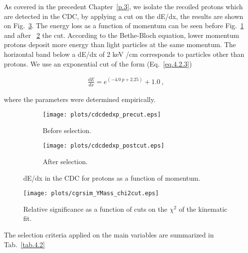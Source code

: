 As covered in the precedent Chapter~\ref{p.3}, we isolate the recoiled protons which are detected in the CDC, by applying a cut on the dE/dx, the results are shown on Fig.~\ref{fig.4.2.2}. The energy loss as a function of momentum can be seen before Fig.~\ref{fig.4.2.2.a} and after ~\ref{fig.4.2.2.b} the cut. According to the Bethe-Bloch equation, lower momentum protons deposit more energy than light particles at the same momentum. The horizontal band below a dE/dx of 2 keV /cm corresponds to particles other than protons. We use an exponential cut of the form (Eq.~\ref{eq.4.2.3})

\begin{equation}
    \begin{aligned}
        \label{eq.4.2.3}
        \frac{dE}{dx} =  e^{(-4.0~p + 2.25)} + 1.0~,
    \end{aligned}
\end{equation}

where the parameters were determined empirically.
 
\begin{figure}[H]
    \centering
    \begin{subfigure}[b]{0.45\textwidth}
        \texttt{[image: plots/cdcdedxp\_precut.eps]}
        \caption{Before selection.}
        \label{fig.4.2.2.a}
    \end{subfigure}\hfill
    \begin{subfigure}[b]{0.45\textwidth}
        \texttt{[image: plots/cdcdedxp\_postcut.eps]}
        \caption{After selection.}
        \label{fig.4.2.2.b}
    \end{subfigure}\hfill
    \caption{dE/dx in the CDC for protons as a function of momentum.}
    \label{fig.4.2.2}
\end{figure}


\begin{figure}[H]
    \centering
        \texttt{[image: plots/cgrsim\_YMass\_chi2cut.eps]}
        \caption{Relative significance as a function of cuts on the $\chi^{2}$ of the kinematic fit.}
        \label{fig.4.2.3}
\end{figure}

The selection criteria applied on the main variables are summarized in Tab.~\ref{tab.4.2}

